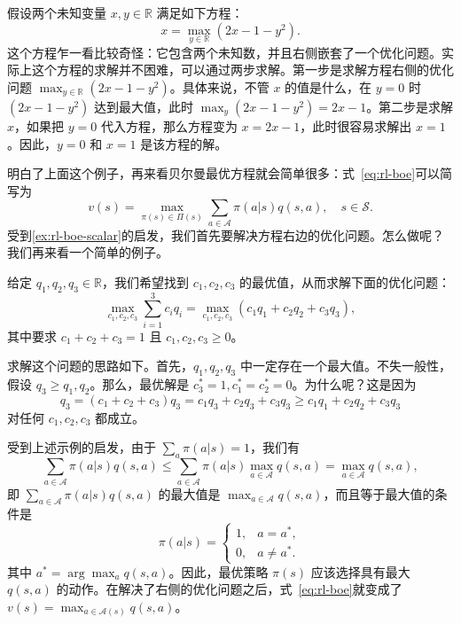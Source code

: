 \begin{example}
\label{ex:rl-boe-scalar}
假设两个未知变量 $x, y \in \mathbb{R}$ 满足如下方程：
\begin{equation}
  x = \max_{y \in \mathbb{R}} (2x - 1 - y^2).
\end{equation}
这个方程乍一看比较奇怪：它包含两个未知数，并且右侧嵌套了一个优化问题。实际上这个方程的求解并不困难，可以通过两步求解。第一步是求解方程右侧的优化问题 $\max_{y \in \mathbb{R}}(2x - 1 - y^2)$。具体来说，不管 $x$ 的值是什么，在 $y = 0$ 时 $(2x - 1 - y^2)$ 达到最大值，此时 $\max_y(2x - 1 - y^2) = 2x - 1$。第二步是求解 $x$，如果把 $y = 0$ 代入方程，那么方程变为 $x = 2x - 1$，此时很容易求解出 $x = 1$。因此，$y = 0$ 和 $x = 1$ 是该方程的解。
\end{example}

明白了上面这个例子，再来看贝尔曼最优方程就会简单很多：式~\eqref{eq:rl-boe}可以简写为
\begin{equation}
  v(s) = \max_{\pi(s) \in \varPi(s)} \sum_{a \in \mathcal{A}} \pi(a|s) q(s,a), \quad s \in \mathcal{S}.
\end{equation}
受到\cref{ex:rl-boe-scalar}的启发，我们首先要解决方程右边的优化问题。怎么做呢？我们再来看一个简单的例子。

\begin{example}
\label{ex:rl-boe-simplex}
给定 $q_1, q_2, q_3 \in \mathbb{R}$，我们希望找到 $c_1, c_2, c_3$ 的最优值，从而求解下面的优化问题：
\begin{equation}
  \max_{c_1, c_2, c_3} \sum_{i=1}^{3} c_i q_i = \max_{c_1, c_2, c_3} \left( c_1 q_1 + c_2 q_2 + c_3 q_3 \right),
\end{equation}
其中要求 $c_1 + c_2 + c_3 = 1$ 且 $c_1, c_2, c_3 \geqslant 0$。

求解这个问题的思路如下。首先，$q_1, q_2, q_3$ 中一定存在一个最大值。不失一般性，假设 $q_3 \geqslant q_1, q_2$。那么，最优解是 $c_3^* = 1, c_1^* = c_2^* = 0$。为什么呢？这是因为
\begin{equation}
  q_3 = (c_1 + c_2 + c_3) q_3 = c_1 q_3 + c_2 q_3 + c_3 q_3 \geqslant c_1 q_1 + c_2 q_2 + c_3 q_3
\end{equation}
对任何 $c_1, c_2, c_3$ 都成立。
\end{example}

受到上述示例的启发，由于 $\sum_a \pi(a|s) = 1$，我们有
\begin{equation}
  \sum_{a \in \mathcal{A}} \pi(a|s) q(s,a) \leqslant \sum_{a \in \mathcal{A}} \pi(a|s) \max_{a \in \mathcal{A}} q(s,a) = \max_{a \in \mathcal{A}} q(s,a),
\end{equation}
即 $\sum_{a \in \mathcal{A}} \pi(a|s) q(s,a)$ 的最大值是 $\max_{a \in \mathcal{A}} q(s,a)$，而且等于最大值的条件是
\begin{equation}
  \pi(a|s) = \begin{cases} 1, & a = a^*,\\ 0, & a \neq a^*. \end{cases}
\end{equation}
其中 $a^* = \arg\max_a q(s,a)$。因此，最优策略 $\pi(s)$ 应该选择具有最大 $q(s,a)$ 的动作。在解决了右侧的优化问题之后，式~\eqref{eq:rl-boe}就变成了 $v(s) = \max_{a \in \mathcal{A}(s)} q(s,a)$。

